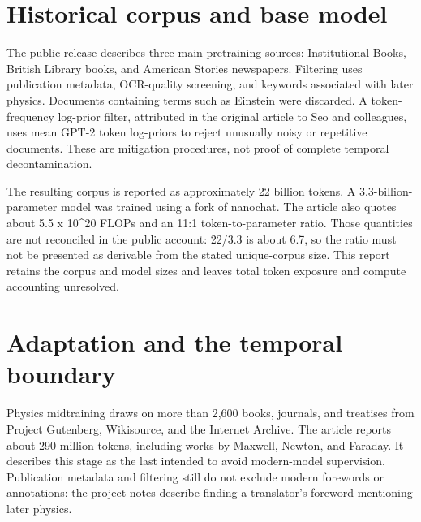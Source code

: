\documentclass[10pt,a4paper]{article}
\begin{document}
\section{Historical corpus and base model}
The public release describes three main pretraining sources: Institutional Books, British Library books, and American Stories newspapers. Filtering uses publication metadata, OCR-quality screening, and keywords associated with later physics. Documents containing terms such as Einstein were discarded. A token-frequency log-prior filter, attributed in the original article to Seo and colleagues, uses mean GPT-2 token log-priors to reject unusually noisy or repetitive documents. These are mitigation procedures, not proof of complete temporal decontamination. \cite{ref1}

The resulting corpus is reported as approximately 22 billion tokens. A 3.3-billion-parameter model was trained using a fork of nanochat. The article also quotes about 5.5 x 10\textasciicircum{}20 FLOPs and an 11:1 token-to-parameter ratio. Those quantities are not reconciled in the public account: 22/3.3 is about 6.7, so the ratio must not be presented as derivable from the stated unique-corpus size. This report retains the corpus and model sizes and leaves total token exposure and compute accounting unresolved. \cite{ref1,ref2}

\section{Adaptation and the temporal boundary}
Physics midtraining draws on more than 2,600 books, journals, and treatises from Project Gutenberg, Wikisource, and the Internet Archive. The article reports about 290 million tokens, including works by Maxwell, Newton, and Faraday. It describes this stage as the last intended to avoid modern-model supervision. Publication metadata and filtering still do not exclude modern forewords or annotations: the project notes describe finding a translator's foreword mentioning later physics. \cite{ref1}
\end{document}
